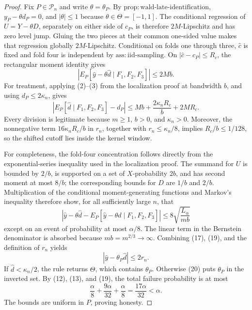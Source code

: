 \documentclass{article}
\begin{document}
\begin{proof}
Fix \(P\in\mathcal P_n\) and write \(\theta=\theta_P\).  By
\(\mathrm{prop:wald\mbox{-}late\mbox{-}identification}\),
\(y_P-\theta d_P=0\), and \(|\theta|\le1\) because
\(\theta\in\Theta=[-1,1]\).  The conditional regression of
\(U=Y-\theta D\), separately on either side of \(c_P\), is therefore
\(2M\)-Lipschitz and has zero level jump.  Gluing the two pieces at
their common one-sided value makes that regression globally
\(2M\)-Lipschitz.  Conditional on folds one through three,
\(\widehat c\) is fixed and fold four is independent by
\(\mathrm{ass:iid\mbox{-}sampling}\).  On
\(|\widehat c-c_P|\le R_c\), the rectangular moment identity gives
\[
 \left|E_P\left[
 \widehat y-\theta\widehat d\mid F_1,F_2,F_3\right]\right|
 \le2Mb. \tag{17}
\]
For treatment, applying (2)--(3) from the localization proof at
bandwidth \(b\), and using \(d_P\le2\kappa_n\), gives
\[
 \left|E_P[\widehat d\mid F_1,F_2,F_3]-d_P\right|
 \le Mb+\frac{2\kappa_nR_c}{b}+2MR_c. \tag{18}
\]
Every division is legitimate because \(m\ge1\), \(b>0\), and
\(\kappa_n>0\).  Moreover, the nonnegative term
\(16\kappa_nR_c/b\) in \(r_n\), together with
\(r_n\le\kappa_n/8\), implies \(R_c/b\le1/128\), so the shifted
cutoff lies inside the kernel window.

For completeness, the fold-four concentration follows directly from
the exponential-series inequality used in the localization proof.
The summand for \(U\) is bounded by \(2/b\), is supported on a set of
\(X\)-probability \(2b\), and has second moment at most \(8/b\); the
corresponding bounds for \(D\) are \(1/b\) and \(2/b\).  Multiplication
of the conditional moment-generating functions and Markov's inequality
therefore show, for all sufficiently large \(n\), that
\[
 \left|\widehat y-\theta\widehat d
 -E_P[\widehat y-\theta\widehat d\mid F_1,F_2,F_3]\right|
 \le8\sqrt{\frac{L_\alpha}{mb}} \tag{19}
\]
except on an event of probability at most \(\alpha/8\).  The linear
term in the Bernstein denominator is absorbed because
\(mb=m^{2/3}\to\infty\).  Combining (17), (19), and the definition of
\(r_n\) yields
\[
 |\widehat y-\theta_P\widehat d|\le2r_n. \tag{20}
\]
If \(\widehat d<\kappa_n/2\), the rule returns \(\Theta\), which
contains \(\theta_P\).  Otherwise (20) puts \(\theta_P\) in the
inverted set.  By (12), (13), and (19), the total failure probability
is at most
\[
 \frac\alpha8+\frac{9\alpha}{32}+\frac\alpha8
 =\frac{17\alpha}{32}<\alpha.
\]
The bounds are uniform in \(P\), proving honesty.


\end{proof}
\end{document}
